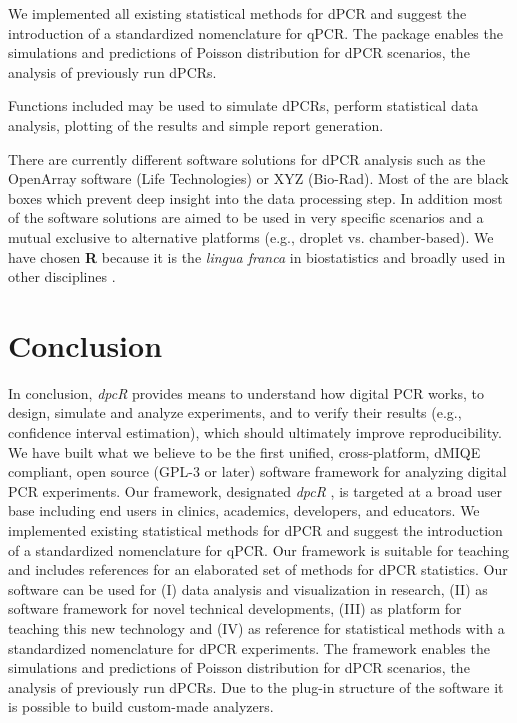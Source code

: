 \documentclass{bioinfo}
\begin{document}
We implemented all existing statistical methods for dPCR and suggest the 
introduction of a standardized nomenclature for qPCR. The package enables the 
simulations and predictions of Poisson distribution for dPCR scenarios, the 
analysis of previously run dPCRs.

Functions included may be used to simulate dPCRs, perform statistical data 
analysis, plotting of the results and simple report generation. 

There are currently different software solutions for dPCR analysis such as the 
OpenArray software (Life Technologies) or XYZ (Bio-Rad). Most of the are black 
boxes which prevent deep insight into the data processing step. In addition most 
of the software solutions are aimed to be used in very specific scenarios and a 
mutual exclusive to alternative platforms (e.g., droplet vs. chamber-based). We 
have chosen \textbf{R} because it is the \textit{lingua franca} in biostatistics and broadly used 
in other disciplines \cite{rodiger_r_2015}.









\section{Conclusion}

In conclusion, \textit{dpcR} provides means to understand how digital PCR works, 
to design, simulate and analyze experiments, and to verify their results (e.g., 
confidence interval estimation), which should ultimately improve 
reproducibility. We have built what we believe to be the first unified, 
cross-platform, dMIQE compliant, open source (GPL-3 or later) software framework for 
analyzing digital PCR experiments. Our framework, designated \textit{dpcR} , is 
targeted at a broad user base including end users in clinics, academics, 
developers, and educators. We implemented existing statistical methods for dPCR 
and suggest the introduction of a standardized nomenclature for qPCR. Our 
framework is suitable for teaching and includes references for an elaborated 
set of methods for dPCR statistics. Our software can be used for (I) data 
analysis and visualization in research, (II) as software framework for novel 
technical developments, (III) as platform for teaching this new technology and 
(IV) as reference for statistical methods with a standardized nomenclature for 
dPCR experiments. The framework enables the simulations and predictions of Poisson 
distribution for dPCR scenarios, the analysis of previously run dPCRs. Due to 
the plug-in structure of the software it is possible to build custom-made 
analyzers.
\end{document}
